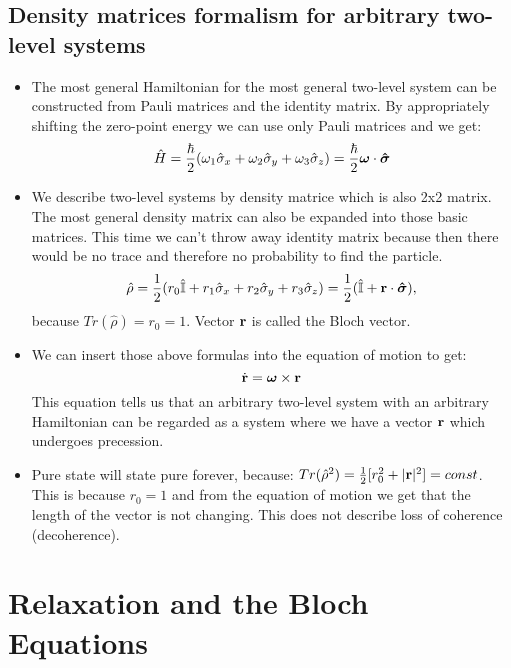 \documentclass[AtomicOptical1Notes.tex]{subfiles}
\begin{document}
	\subsection{Density matrices formalism for arbitrary two-level systems}
		\begin{itemize}
			\item The most general Hamiltonian for the most general two-level system can be constructed from Pauli matrices and the identity matrix. By appropriately shifting the zero-point energy we can use only Pauli matrices and we get: $$ \hat{H} = \frac{\hbar}{2} ( \omega_1\hat{\sigma}_x + \omega_2\hat{\sigma}_y + \omega_3\hat{\sigma}_z) = \frac{\hbar}{2} \mbox{\boldmath$ \omega $} \cdot \mbox{\boldmath$ \hat{\sigma} $} $$
			\item We describe two-level systems by density matrice which is also 2x2 matrix. The most general density matrix can also be expanded into those basic matrices. This time we can't throw away identity matrix because then there would be no trace and therefore no probability to find the particle. $$ \hat{\rho} = \frac{1}{2} ( r_0\hat{\mathbb{I}} + r_1\hat{\sigma}_x + r_2\hat{\sigma}_y + r_3\hat{\sigma}_z) = \frac{1}{2} (\hat{\mathbb{I}} + \mathbf{r} \cdot \mbox{\boldmath$ \hat{\sigma} $}), $$ because $ Tr(\hat{\rho})=r_0=1 $. Vector $ \mathbf{r} $ is called the Bloch vector.
			\item We can insert those above formulas into the equation of motion to get: $$ \dot{\mathbf{r}} = \mbox{\boldmath$ \omega $}\times\mathbf{r} $$ This equation tells us that an arbitrary two-level system with an arbitrary Hamiltonian can be regarded as a system where we have a vector $\mathbf{r}$ which undergoes precession.
			\item Pure state will state pure forever, because: $ Tr(\hat{\rho}^2)=\frac{1}{2}[r_0^2+|\mathbf{r}|^2]=const $. This is because $r_0=1$ and from the equation of motion we get that the length of the vector is not changing. This does not describe loss of coherence (decoherence).
		\end{itemize}
	
\section{Relaxation and the Bloch Equations}
\end{document}
